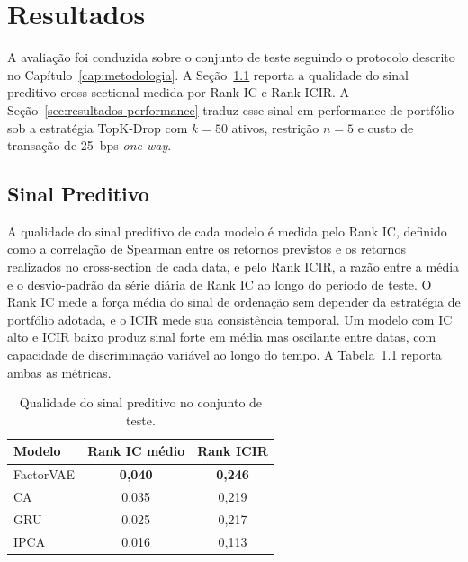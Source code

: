 \chapter{Resultados}
\label{cap:resultados}

A avaliação foi conduzida sobre o conjunto de teste seguindo o protocolo descrito no Capítulo~\ref{cap:metodologia}. A Seção~\ref{sec:resultados-skill} reporta a qualidade do sinal preditivo cross-sectional medida por Rank IC e Rank ICIR. A Seção~\ref{sec:resultados-performance} traduz esse sinal em performance de portfólio sob a estratégia TopK-Drop com $k = 50$ ativos, restrição $n = 5$ e custo de transação de 25~bps \textit{one-way}.


\section{Sinal Preditivo}
\label{sec:resultados-skill}

A qualidade do sinal preditivo de cada modelo é medida pelo Rank IC, definido como a correlação de Spearman entre os retornos previstos e os retornos realizados no cross-section de cada data, e pelo Rank ICIR, a razão entre a média e o desvio-padrão da série diária de Rank IC ao longo do período de teste. O Rank IC mede a força média do sinal de ordenação sem depender da estratégia de portfólio adotada, e o ICIR mede sua consistência temporal. Um modelo com IC alto e ICIR baixo produz sinal forte em média mas oscilante entre datas, com capacidade de discriminação variável ao longo do tempo. A Tabela~\ref{tab:skill} reporta ambas as métricas.

\begin{table}[htbp]
    \centering
    \caption{Qualidade do sinal preditivo no conjunto de teste.}
    \label{tab:skill}
    \begin{tabular}{lcc}
        \toprule
        \textbf{Modelo} & \textbf{Rank IC médio} & \textbf{Rank ICIR} \\
        \midrule
        FactorVAE        & \textbf{0{,}040}       & \textbf{0{,}246}   \\
        CA               & 0{,}035                & 0{,}219            \\
        GRU              & 0{,}025                & 0{,}217            \\
        IPCA             & 0{,}016                & 0{,}113            \\
        \bottomrule
    \end{tabular}
\end{table}

